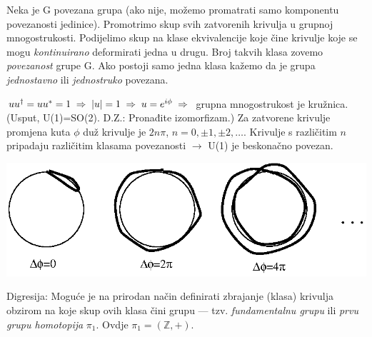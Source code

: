 \begin{definicija}[Povezanost]
  Neka je G povezana grupa (ako nije, možemo promatrati samo komponentu
povezanosti jedinice). Promotrimo skup svih zatvorenih krivulja u grupnoj 
mnogostrukosti. Podijelimo skup  na klase ekvivalencije koje čine 
krivulje koje se mogu \emph{kontinuirano} deformirati jedna u drugu.
Broj takvih klasa zovemo \emph{povezanost} grupe G. Ako postoji samo
jedna klasa kažemo da je grupa \emph{jednostavno} ili \emph{jednostruko}
povezana.
\end{definicija}

\begin{primjer}[U(1)]
$u u^\dagger = u u^* = 1 \;\Rightarrow\; |u|=1 \;\Rightarrow\; u=e^{i\phi} \;\Rightarrow\;$ grupna
mnogostrukost je kružnica.
(Usput, U(1)=SO(2). D.Z.: Pronađite izomorfizam.)
Za zatvorene krivulje promjena kuta $\phi$ duž krivulje je $2n\pi$,
$n=0,\pm 1, \pm 2, \ldots$. Krivulje s različitim $n$ pripadaju
različitim klasama povezanosti $\to$ U(1) je beskonačno povezan.

\centerline{\includegraphics[scale=1.0]{pics/homotopija.eps}}

Digresija: Moguće je na prirodan način definirati zbrajanje (klasa) krivulja 
obzirom na koje skup ovih klasa čini grupu --- tzv. \emph{fundamentalnu
grupu} ili \emph{prvu grupu homotopija} $\pi_1$. Ovdje $\pi_1=(\mathbb{Z}, +)$.

\end{primjer}

